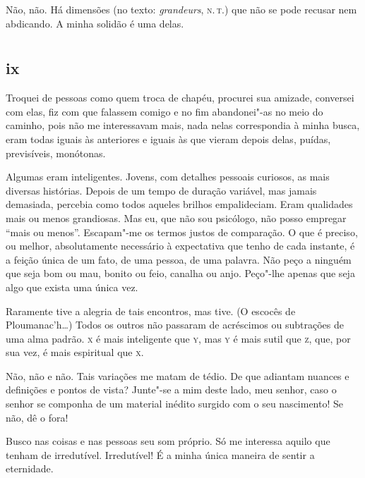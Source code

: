 Não, não. Há dimensões (no texto: \textit{grandeurs}, \textsc{n.\,t.}) que não se
pode recusar nem abdicando. A minha solidão é uma delas.

\chapter*{}
\section{ix}

\noindent{}Troquei de pessoas como quem troca de chapéu, procurei sua amizade,
conversei com elas, fiz com que falassem comigo e no fim abandonei"-as
no meio do caminho, pois não me interessavam mais, nada nelas
correspondia à minha busca, eram todas iguais às anteriores e
iguais às que vieram depois delas, puídas, previsíveis, monótonas.

Algumas eram inteligentes. Jovens, com detalhes pessoais curiosos,
as mais diversas histórias. Depois de um tempo de duração variável,
mas jamais demasiada, percebia como todos aqueles brilhos
empalideciam. Eram qualidades mais ou menos grandiosas. Mas eu, que não
sou psicólogo, não posso empregar ``mais ou menos''. Escapam"-me os
termos justos de comparação. O que é preciso, ou melhor,
absolutamente necessário à expectativa que tenho de cada instante, é a
feição única de um fato, de uma pessoa, de uma palavra. Não peço a
ninguém que seja bom ou mau, bonito ou feio, canalha ou anjo. Peço"-lhe
apenas que seja algo que exista uma única vez.

Raramente tive a alegria de tais encontros, mas tive. (O escocês de
Ploumanac'h\ldots{}) Todos os outros não passaram de acréscimos ou
subtrações de uma alma padrão. \textsc{x} é mais inteligente que \textsc{y}, mas \textsc{y} é mais
sutil que \textsc{z}, que, por sua vez, é mais espiritual que \textsc{x.}

Não, não e não. Tais variações me matam de tédio. De que adiantam
nuances e definições e pontos de vista? Junte"-se a mim deste lado, meu
senhor, caso o senhor se componha de um material inédito surgido com o
seu nascimento! Se não, dê o fora!

Busco nas coisas e nas pessoas seu som próprio. Só me interessa aquilo
que tenham de irredutível. Irredutível! É a minha única maneira de
sentir a eternidade.


\chapter*{}
